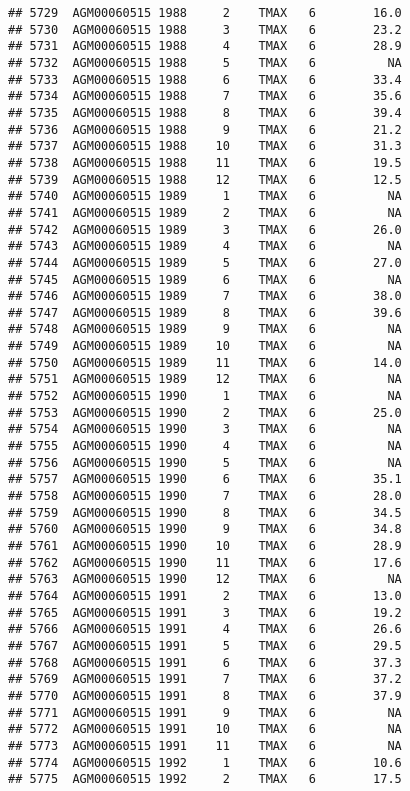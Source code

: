 \documentclass{article}\usepackage[]{graphicx}\usepackage[]{color}
\makeatletter
\newenvironment{kframe}{%
 \def\at@end@of@kframe{}%
 \ifinner\ifhmode%
  \def\at@end@of@kframe{\end{minipage}}%
  \begin{minipage}{\columnwidth}%
 \fi\fi%
 \def\FrameCommand##1{\hskip\@totalleftmargin \hskip-\fboxsep
 \colorbox{shadecolor}{##1}\hskip-\fboxsep
     \hskip-\linewidth \hskip-\@totalleftmargin \hskip\columnwidth}%
 \MakeFramed {\advance\hsize-\width
   \@totalleftmargin\z@ \linewidth\hsize
   \@setminipage}}%
 {\par\unskip\endMakeFramed%
 \at@end@of@kframe}
\newenvironment{knitrout}{}{} %
\makeatother
\begin{document}
\begin{knitrout}
\begin{kframe}
\begin{verbatim}
## 5729  AGM00060515 1988     2    TMAX   6        16.0
## 5730  AGM00060515 1988     3    TMAX   6        23.2
## 5731  AGM00060515 1988     4    TMAX   6        28.9
## 5732  AGM00060515 1988     5    TMAX   6          NA
## 5733  AGM00060515 1988     6    TMAX   6        33.4
## 5734  AGM00060515 1988     7    TMAX   6        35.6
## 5735  AGM00060515 1988     8    TMAX   6        39.4
## 5736  AGM00060515 1988     9    TMAX   6        21.2
## 5737  AGM00060515 1988    10    TMAX   6        31.3
## 5738  AGM00060515 1988    11    TMAX   6        19.5
## 5739  AGM00060515 1988    12    TMAX   6        12.5
## 5740  AGM00060515 1989     1    TMAX   6          NA
## 5741  AGM00060515 1989     2    TMAX   6          NA
## 5742  AGM00060515 1989     3    TMAX   6        26.0
## 5743  AGM00060515 1989     4    TMAX   6          NA
## 5744  AGM00060515 1989     5    TMAX   6        27.0
## 5745  AGM00060515 1989     6    TMAX   6          NA
## 5746  AGM00060515 1989     7    TMAX   6        38.0
## 5747  AGM00060515 1989     8    TMAX   6        39.6
## 5748  AGM00060515 1989     9    TMAX   6          NA
## 5749  AGM00060515 1989    10    TMAX   6          NA
## 5750  AGM00060515 1989    11    TMAX   6        14.0
## 5751  AGM00060515 1989    12    TMAX   6          NA
## 5752  AGM00060515 1990     1    TMAX   6          NA
## 5753  AGM00060515 1990     2    TMAX   6        25.0
## 5754  AGM00060515 1990     3    TMAX   6          NA
## 5755  AGM00060515 1990     4    TMAX   6          NA
## 5756  AGM00060515 1990     5    TMAX   6          NA
## 5757  AGM00060515 1990     6    TMAX   6        35.1
## 5758  AGM00060515 1990     7    TMAX   6        28.0
## 5759  AGM00060515 1990     8    TMAX   6        34.5
## 5760  AGM00060515 1990     9    TMAX   6        34.8
## 5761  AGM00060515 1990    10    TMAX   6        28.9
## 5762  AGM00060515 1990    11    TMAX   6        17.6
## 5763  AGM00060515 1990    12    TMAX   6          NA
## 5764  AGM00060515 1991     2    TMAX   6        13.0
## 5765  AGM00060515 1991     3    TMAX   6        19.2
## 5766  AGM00060515 1991     4    TMAX   6        26.6
## 5767  AGM00060515 1991     5    TMAX   6        29.5
## 5768  AGM00060515 1991     6    TMAX   6        37.3
## 5769  AGM00060515 1991     7    TMAX   6        37.2
## 5770  AGM00060515 1991     8    TMAX   6        37.9
## 5771  AGM00060515 1991     9    TMAX   6          NA
## 5772  AGM00060515 1991    10    TMAX   6          NA
## 5773  AGM00060515 1991    11    TMAX   6          NA
## 5774  AGM00060515 1992     1    TMAX   6        10.6
## 5775  AGM00060515 1992     2    TMAX   6        17.5

\end{verbatim}
\end{kframe}
\end{knitrout}
\end{document}
